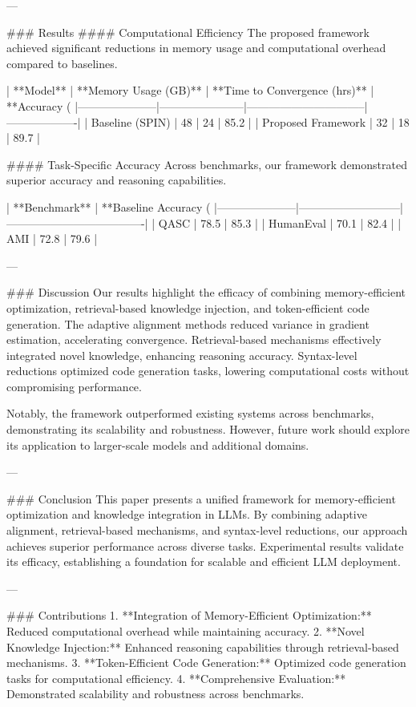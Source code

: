 ---

### Results  
#### Computational Efficiency  
The proposed framework achieved significant reductions in memory usage and computational overhead compared to baselines.  

| **Model**          | **Memory Usage (GB)** | **Time to Convergence (hrs)** | **Accuracy (%
|---------------------|-----------------------|--------------------------------|-------------------|  
| Baseline (SPIN)     | 48                   | 24                             | 85.2             |  
| Proposed Framework  | 32                   | 18                             | 89.7             |  

#### Task-Specific Accuracy  
Across benchmarks, our framework demonstrated superior accuracy and reasoning capabilities.  

| **Benchmark**       | **Baseline Accuracy (%
|---------------------|---------------------------|-------------------------------------|  
| QASC               | 78.5                      | 85.3                                |  
| HumanEval          | 70.1                      | 82.4                                |  
| AMI                | 72.8                      | 79.6                                |  

---

### Discussion  
Our results highlight the efficacy of combining memory-efficient optimization, retrieval-based knowledge injection, and token-efficient code generation. The adaptive alignment methods reduced variance in gradient estimation, accelerating convergence. Retrieval-based mechanisms effectively integrated novel knowledge, enhancing reasoning accuracy. Syntax-level reductions optimized code generation tasks, lowering computational costs without compromising performance.  

Notably, the framework outperformed existing systems across benchmarks, demonstrating its scalability and robustness. However, future work should explore its application to larger-scale models and additional domains.  

---

### Conclusion  
This paper presents a unified framework for memory-efficient optimization and knowledge integration in LLMs. By combining adaptive alignment, retrieval-based mechanisms, and syntax-level reductions, our approach achieves superior performance across diverse tasks. Experimental results validate its efficacy, establishing a foundation for scalable and efficient LLM deployment.  

---

### Contributions  
1. **Integration of Memory-Efficient Optimization:** Reduced computational overhead while maintaining accuracy.  
2. **Novel Knowledge Injection:** Enhanced reasoning capabilities through retrieval-based mechanisms.  
3. **Token-Efficient Code Generation:** Optimized code generation tasks for computational efficiency.  
4. **Comprehensive Evaluation:** Demonstrated scalability and robustness across benchmarks.